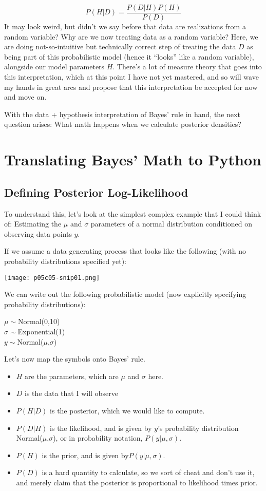 \begin{equation}
P(H|D)=\frac{P(D|H)P(H)}{P(D)}
\end{equation}
It may look weird, but didn't we say before that data are realizations from a random variable? Why are we now treating data as a random variable? Here, we are doing not-so-intuitive but technically correct step of treating the data $D$
as being part of this probabilistic model (hence it ``looks'' like a random variable), alongside our model parameters $H$. There's a lot of measure theory that goes into this interpretation, which at this point I have not yet mastered, and so will wave my hands in great arcs and propose that this interpretation be accepted for now and move on.


With the data + hypothesis interpretation of Bayes' rule in hand, the next question arises: What math happens when we calculate posterior densities?

\section{Translating Bayes' Math to Python}
\subsection{Defining Posterior Log-Likelihood}

To understand this, let's look at the simplest complex example that I could think of: Estimating the $\mu$ and $\sigma$ parameters of a normal distribution conditioned on observing data points $y$.


If we assume a data generating process that looks like the following (with no probability distributions specified yet):
\begin{marginfigure}
\texttt{[image: p05c05-snip01.png]}
\end{marginfigure}

We can write out the following probabilistic model (now explicitly specifying probability distributions):

$\mu\sim$Normal(0,10)\\
$\sigma\sim$Exponential(1)\\
$y\sim$Normal($\mu$,$\sigma$)

Let's now map the symbols onto Bayes' rule.
\begin{itemize}
\item $H$ are the parameters, which are $\mu$ and $\sigma$ here.
\item $D$ is the data that I will observe
\item $P(H|D)$  is the posterior, which we would like to compute.
\item $P(D|H)$ is the likelihood, and is given by $y$'s probability distribution Normal($\mu$,$\sigma$), or in probability notation, $P(y|\mu,\sigma)$.
\item $P(H)$ is the prior, and is given by$P(y|\mu,\sigma)$.
\item $P(D)$ is a hard quantity to calculate, so we sort of cheat and don't use it, and merely claim that the posterior is proportional to likelihood times prior.
\end{itemize}

